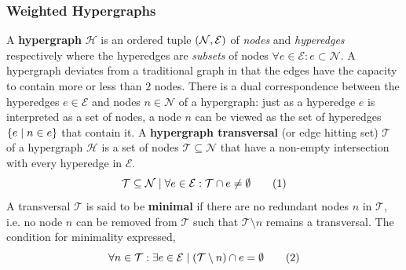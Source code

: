 \documentclass[aps, 10pt, english, twoside, pra, nofootinbib, longbibliography]{revtex4-1}
\theoremstyle{plain}
\theoremstyle{definition}
\theoremstyle{remark}
\newcommand{\hgraph}{\mathcal{H}}
\newcommand{\nodes}{\mathcal{N}}
\newcommand{\edges}{\mathcal{E}}
\newcommand{\trans}{\mathcal{T}}
\newcommand{\ext}{\mathrel{\Yleft}}
\newcommand{\mscenario}{\mathcal{M}}
\newcommand{\jointvar}{\mathcal{J}}
\newcommand{\supp}[1]{\si\br{#1}}
\newcommand{\isext}[2]{\delta_{#1 \ext #2}}
\newcommand{\term}[1]{\textcolor{Mahogany}{\textbf{#1}}}
\begin{document}


    \subsubsection{Weighted Hypergraphs}
    A \term{hypergraph} $\hgraph$ is an ordered tuple $\br{\nodes, \edges}$ of \textit{nodes} and \textit{hyperedges} respectively where the hyperedges are \textit{subsets} of nodes $\forall e \in \edges : e \subset \nodes$. A hypergraph deviates from a traditional graph in that the edges have the capacity to contain more or less than $2$ nodes. There is a dual correspondence between the hyperedges $e \in \edges$ and nodes $n \in \nodes$ of a hypergraph: just as a hyperedge $e$ is interpreted as a set of nodes, a node $n$ can be viewed as the set of hyperedges $\bc{e \mid n \in e}$ that contain it. A \term{hypergraph transversal} (or edge hitting set) $\trans$ of a hypergraph $\hgraph$ is a set of nodes $\trans \subseteq \nodes$ that have a non-empty intersection with every hyperedge in $\edges$.
    \[ \trans \subseteq \nodes \mid \forall e \in \edges : \trans \cap e \neq \emptyset \eq \label{eq:flat_trans_def}\]
    A transversal $\trans$ is said to be \term{minimal} if there are no redundant nodes $n$ in $\trans$, i.e. no node $n$ can be removed from $\trans$ such that $\trans \setminus n$ remains a transversal. The condition for minimality expressed,
    \[ \forall n \in \trans : \exists e \in \edges \mid \br{\trans \setminus n} \cap e = \emptyset \eq \label{eq:flat_trans_minimal}\]
\end{document}
